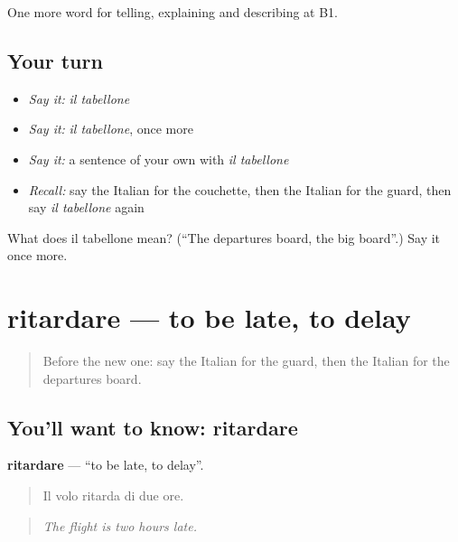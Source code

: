 \begin{grammarlens}[title={What you've built}]
One more word for telling, explaining and describing at B1.
\end{grammarlens}

\subsection*{Your turn}
\begin{itemize}
\raggedright
  \item \emph{Say it:} \emph{il tabellone}
  \item \emph{Say it:} \emph{il tabellone}, once more
  \item \emph{Say it:} a sentence of your own with \emph{il tabellone}
  \item \emph{Recall:} say the Italian for the couchette, then the Italian for the guard, then say \emph{il tabellone} again
\end{itemize}

\begin{tcolorbox}[breakable,colback=teal!4,colframe=teal!35!black,title={Before you move on}]
What does il tabellone mean? (\textquotedblleft{}The departures board, the big board\textquotedblright{}.) Say it once more.
\end{tcolorbox}
\section[ritardare]{ritardare — to be late, to delay}

\label{lesson:IT-C420-ritardare}



\begin{quote}
Before the new one: say the Italian for the guard, then the Italian for the departures board.
\end{quote}

\subsection*{You'll want to know: ritardare}
\textbf{ritardare} — \textquotedblleft{}to be late, to delay\textquotedblright{}.

\begin{quote}
Il volo ritarda di due ore.
\end{quote}

\begin{quote}
\emph{The flight is two hours late.}
\end{quote}

